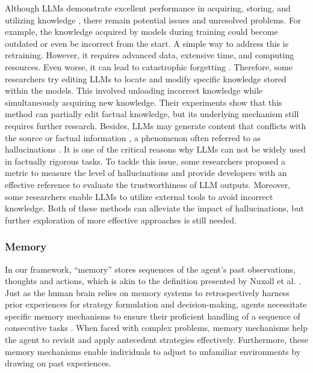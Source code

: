 Although LLMs demonstrate excellent performance in acquiring, storing, and utilizing knowledge \cite{DBLP:journals/corr/abs-2204-06031}, there remain potential issues and unresolved problems. For example, the knowledge acquired by models during training could become outdated or even be incorrect from the start. A simple way to address this is retraining. However, it requires advanced data, extensive time, and computing resources. Even worse, it can lead to catastrophic forgetting \cite{DBLP:conf/aaai/KemkerMAHK18}. Therefore, some researchers\cite{DBLP:conf/emnlp/CaoAT21,DBLP:journals/corr/abs-2305-13172,DBLP:conf/icml/MitchellLBMF22} try editing LLMs to locate and modify specific knowledge stored within the models. This involved unloading incorrect knowledge while simultaneously acquiring new knowledge. Their experiments show that this method can partially edit factual knowledge, but its underlying mechanism still requires further research. Besides, LLMs may generate content that conflicts with the source or factual information \cite{DBLP:conf/icml/ShiCMSDCSZ23}, a phenomenon often referred to as hallucinations \cite{DBLP:journals/corr/abs-2309-01219}. It is one of the critical reasons why LLMs can not be widely used in factually rigorous tasks. To tackle this issue, some researchers \cite{DBLP:journals/corr/abs-2303-08896} proposed a metric to measure the level of hallucinations and provide developers with an effective reference to evaluate the trustworthiness of LLM outputs. Moreover, some researchers\cite{DBLP:journals/corr/abs-2305-14623,DBLP:journals/corr/abs-2305-11738} enable LLMs to utilize external tools\cite{DBLP:journals/corr/abs-2304-08354,DBLP:journals/corr/abs-2302-07842,DBLP:journals/corr/abs-2307-11019} to avoid incorrect knowledge. Both of these methods can alleviate the impact of hallucinations, but further exploration of more effective approaches is still needed.

\subsubsection{Memory} \label{sec:memory}
In our framework, ``memory'' stores sequences of the agent's past observations, thoughts and actions, which is akin to the definition presented by Nuxoll et al. \cite{nuxoll2007extending}. Just as the human brain relies on memory systems to retrospectively harness prior experiences for strategy formulation and decision-making, agents necessitate specific memory mechanisms to ensure their proficient handling of a sequence of consecutive tasks \cite{squire1986mechanisms,schwabe2014reconsolidation,hutter2000theory}. When faced with complex problems, memory mechanisms help the agent to revisit and apply antecedent strategies effectively. Furthermore, these memory mechanisms enable individuals to adjust to unfamiliar environments by drawing on past experiences.

